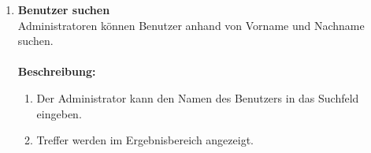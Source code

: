 \documentclass[parskip=full,11pt]{scrartcl}
\def\threedigits#1{%
  \ifnum#1<10 0\fi
  \ifnum#1<1 0\fi
  \number#1}
\begin{document}
\begin{enumerate}[label={\textbf{/F\protect\threedigits{\theenumi}0/}}, leftmargin=*, resume]
\item \label{FAA7} \colorbox{shadecolor} {\textbf{Benutzer suchen}}\\  Administratoren können Benutzer anhand von Vorname und Nachname suchen.\\\\
\textbf{Beschreibung:}\\
\begin{enumerate}[label=(\arabic*), leftmargin=*]
	\item Der Administrator kann den Namen des Benutzers in das Suchfeld eingeben.\\
	\item Treffer werden im Ergebnisbereich angezeigt.
	\end{enumerate}
\end{enumerate}
\end{document}
